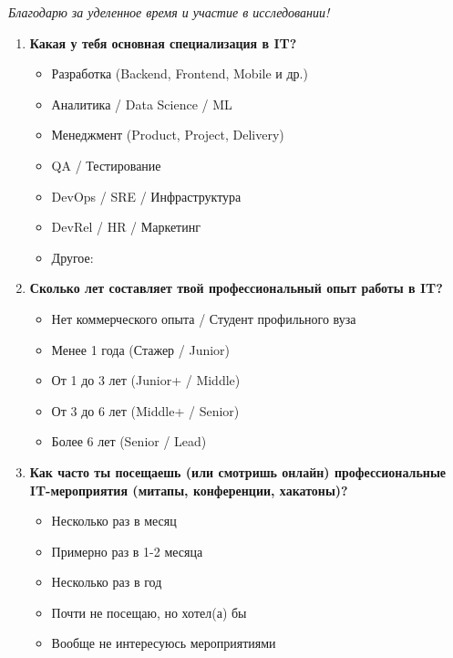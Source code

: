 \textit{Благодарю за уделенное время и участие в исследовании!}

\vspace{1em}

\begin{enumerate}

    \item \textbf{Какая у тебя основная специализация в IT?}
    \begin{itemize}
        \item[$\bigcirc$] Разработка (Backend, Frontend, Mobile и др.)
        \item[$\bigcirc$] Аналитика / Data Science / ML
        \item[$\bigcirc$] Менеджмент (Product, Project, Delivery)
        \item[$\bigcirc$] QA / Тестирование
        \item[$\bigcirc$] DevOps / SRE / Инфраструктура
        \item[$\bigcirc$] DevRel / HR / Маркетинг
        \item[$\bigcirc$] Другое: \hrulefill
    \end{itemize}

    \vspace{1em}

    \item \textbf{Сколько лет составляет твой профессиональный опыт работы в IT?}
    \begin{itemize}
        \item[$\bigcirc$] Нет коммерческого опыта / Студент профильного вуза
        \item[$\bigcirc$] Менее 1 года (Стажер / Junior)
        \item[$\bigcirc$] От 1 до 3 лет (Junior+ / Middle)
        \item[$\bigcirc$] От 3 до 6 лет (Middle+ / Senior)
        \item[$\bigcirc$] Более 6 лет (Senior / Lead)
    \end{itemize}

    \vspace{1em}

    \item \textbf{Как часто ты посещаешь (или смотришь онлайн) профессиональные IT-мероприятия (митапы, конференции, хакатоны)?}
    \begin{itemize}
        \item[$\bigcirc$] Несколько раз в месяц
        \item[$\bigcirc$] Примерно раз в 1-2 месяца
        \item[$\bigcirc$] Несколько раз в год
        \item[$\bigcirc$] Почти не посещаю, но хотел(а) бы
        \item[$\bigcirc$] Вообще не интересуюсь мероприятиями
    \end{itemize}


\end{enumerate}
